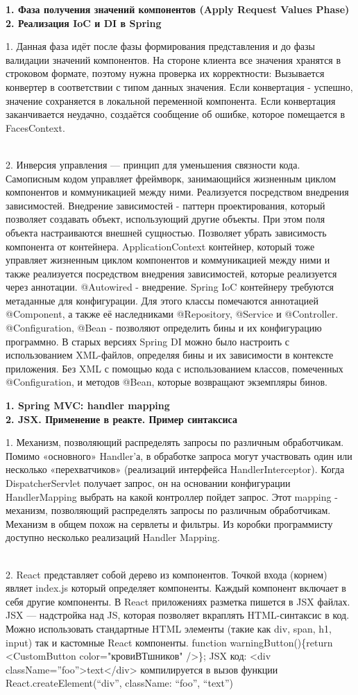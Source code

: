 \documentclass{article}
\newcommand{\bil}[4]{%
    \begin{minipage}{.3\textwidth}
        \textbf{1. #1} \\
        \textbf{2. #2}

        1. #3
        \\
        2. #4
    \end{minipage}
}
\begin{document}
\bil{Фаза получения значений компонентов (Apply Request Values Phase)}{Реализация IoC и DI в Spring}{
    Данная фаза идёт после фазы формирования представления и до фазы валидации значений компонентов.
    На стороне клиента все значения хранятся в строковом формате, поэтому нужна проверка их корректности: 
    Вызывается конвертер в соответствии с типом данных значения.
    Если конвертация - успешно, значение сохраняется в локальной переменной компонента.
    Если конвертация заканчивается неудачно, создаётся сообщение об ошибке, которое помещается в FacesContext.
}{
    Инверсия управления — принцип для уменьшения связности кода. Самописным кодом управляет фреймворк, занимающийся жизненным циклом компонентов и коммуникацией между ними. Реализуется посредством внедрения зависимостей.
    Внедрение зависимостей - паттерн проектирования, который позволяет создавать объект, использующий другие объекты. При этом поля объекта настраиваются внешней сущностью. 
    Позволяет убрать зависимость компонента от контейнера.
    ApplicationContext контейнер, который тоже управляет жизненным циклом компонентов и коммуникацией между ними и также реализуется посредством внедрения зависимостей, которые реализуется через аннотации.
    @Autowired - внедрение. Spring IoC контейнеру требуются метаданные для конфигурации. Для этого классы помечаются аннотацией @Component, а также её наследниками @Repository, @Service и @Controller.
    @Configuration, @Bean - позволяют определить бины и их конфигурацию программно.
    В старых версиях Spring DI можно было настроить с использованием XML-файлов, определяя бины и их зависимости в контексте приложения.
    Без XML с помощью кода с использованием классов, помеченных @Configuration, и методов @Bean, которые возвращают экземпляры бинов.
}
\hfill
\bil{Spring MVC: handler mapping}{JSX. Применение в реакте. Пример синтаксиса}{
    Механизм, позволяющий распределять запросы по различным обработчикам.
    Помимо «основного» Handler'а, в обработке запроса могут участвовать один или несколько «перехватчиков» (реализаций интерфейса HandlerInterceptor).
    Когда DispatcherServlet получает запрос, он на основании конфигурации HandlerMapping выбрать на какой контроллер пойдет запрос. 
    Этот mapping - механизм, позволяющий распределять запросы по различным обработчикам. Механизм в общем похож на сервлеты и
    фильтры. Из коробки программисту доступно несколько реализаций Handler Mapping.
}{
    React представляет собой дерево из компонентов. 
    Точкой входа (корнем) являет index.js который определяет компоненты. 
    Каждый компонент включает в себя другие компоненты.
    В React приложениях разметка пишется в JSX файлах. JSX — надстройка над JS, которая позволяет вкраплять HTML-синтаксис в код. 
    Можно использовать стандартные HTML элементы (такие как div, span, h1, input) так и кастомные React компоненты.
    function warningButton()\{return <CustomButton color="кровиВТшников" />\};
    JSX код: <div className=”foo”>text</div> компилируется в вызов функции React.createElement(“div”, { className: “foo”}, “text”)
}
\end{document}
